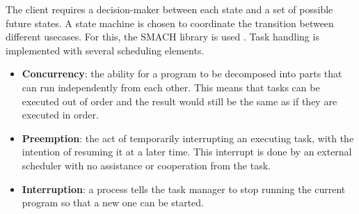 The client requires a decision-maker between each state and a set of possible future states. A state machine is chosen to coordinate the transition between different usecases. For this, the SMACH library is used \cite{smach}. Task handling is implemented with several scheduling elements.


\begin{itemize}
    \item\textbf{Concurrency}: the ability for a program to be decomposed into parts that can run independently from each other. This means that tasks can be executed out of order and the result would still be the same as if they are executed in order. 
    \item\textbf{Preemption}: the act of temporarily interrupting an executing task, with the intention of resuming it at a later time. This interrupt is done by an external scheduler with no assistance or cooperation from the task. 
    \item\textbf{Interruption}: a process tells the task manager to stop running the current program so that a new one can be started. 
\end{itemize}


                                


